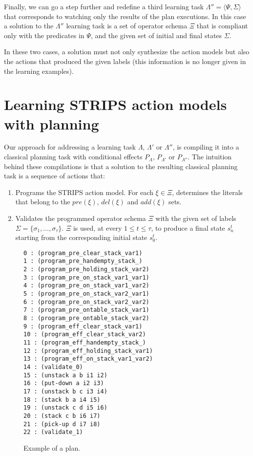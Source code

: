 \documentclass[letterpaper]{article} %
\newcommand{\tup}[1]{{\langle #1 \rangle}}
\begin{document}
Finally, we can go a step further and redefine a third learning task $\Lambda''=\tup{\Psi,\Sigma}$ that corresponds to watching only the results of the plan executions. In this case a solution to the $\Lambda''$ learning task is a set of operator schema $\Xi$ that is compliant only with the predicates in $\Psi$, and the given set of initial and final states $\Sigma$.

In these two cases, a solution must not only synthesize the action models but also the actions that produced the given labels (this information is no longer given in the learning examples).


\section{Learning STRIPS action models with planning}
Our approach for addressing a learning task $\Lambda$, $\Lambda'$ or $\Lambda''$, is compiling it into a classical planning task with conditional effects $P_{\Lambda}$, $P_{\Lambda'}$ or $P_{\Lambda''}$. The intuition behind these compilations is that a solution to the resulting classical planning task is a sequence of actions that:
\begin{enumerate}
\item Programs the STRIPS action model. For each $\xi\in\Xi$, determines the literals that belong to the $pre(\xi)$, $del(\xi)$ and $add(\xi)$ sets.
\item Validates the programmed operator schema $\Xi$ with the given set of labels $\Sigma=\{\sigma_1,\ldots,\sigma_{\tau}\}$. $\Xi$ is used, at every {\small $1\leq t\leq \tau$}, to produce a final state $s_{n}^t$ starting from the corresponding initial state $s_0^t$.
\end{enumerate}



\begin{figure}[hbt]
\begin{footnotesize}
\begin{scriptsize}
\begin{verbatim}
0 : (program_pre_clear_stack_var1)
1 : (program_pre_handempty_stack_)
2 : (program_pre_holding_stack_var2)
3 : (program_pre_on_stack_var1_var1)
4 : (program_pre_on_stack_var1_var2)
5 : (program_pre_on_stack_var2_var1)
6 : (program_pre_on_stack_var2_var2)
7 : (program_pre_ontable_stack_var1)
8 : (program_pre_ontable_stack_var2)
9 : (program_eff_clear_stack_var1)
10 : (program_eff_clear_stack_var2)
11 : (program_eff_handempty_stack_)
12 : (program_eff_holding_stack_var1)
13 : (program_eff_on_stack_var1_var2)
14 : (validate_0)
15 : (unstack a b i1 i2)
16 : (put-down a i2 i3)
17 : (unstack b c i3 i4)
18 : (stack b a i4 i5)
19 : (unstack c d i5 i6)
20 : (stack c b i6 i7)
21 : (pick-up d i7 i8)
22 : (validate_1)
\end{verbatim}
\end{scriptsize}
\end{footnotesize}
 \caption{\small Example of a plan.}
\label{fig:plan}
\end{figure}
\end{document}
